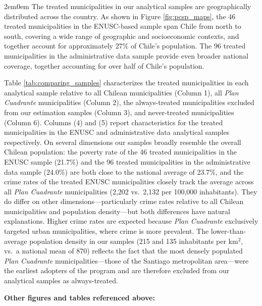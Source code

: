 \begin{adjustwidth}{2em}{0em}
The treated municipalities in our analytical samples are geographically distributed across the country. As shown in Figure \ref{fig:pcsp_maps}, the 46 treated municipalities in the ENUSC-based sample span Chile from north to south, covering a wide range of geographic and socioeconomic contexts, and together account for approximately 27\% of Chile's population. The 96 treated municipalities in the administrative data sample provide even broader national coverage, together accounting for over half of Chile's population.

Table \ref{tab:comparing_samples} characterizes the treated municipalities in each analytical sample relative to all Chilean municipalities (Column 1), all \emph{Plan Cuadrante} municipalities (Column 2), the always-treated municipalities excluded from our estimation samples (Column 3), and never-treated municipalities (Column 6). Columns (4) and (5) report characteristics for the treated municipalities in the ENUSC and administrative data analytical samples respectively. On several dimensions our samples broadly resemble the overall Chilean population: the poverty rate of the 46 treated municipalities in the ENUSC sample (21.7\%) and the 96 treated municipalities in the administrative data sample (24.0\%) are both close to the national average of 23.7\%, and the crime rates of the treated ENUSC municipalities closely track the average across all \emph{Plan Cuadrante} municipalities (2,202 vs.\ 2,132 per 100,000 inhabitants). They do differ on other dimensions---particularly crime rates relative to all Chilean municipalities and population density---but both differences have natural explanations. Higher crime rates are expected because \emph{Plan Cuadrante} exclusively targeted urban municipalities, where crime is more prevalent. The lower-than-average population density in our samples (215 and 135 inhabitants per km$^2$, vs.\ a national mean of 870) reflects the fact that the most densely populated \emph{Plan Cuadrante} municipalities---those of the Santiago metropolitan area---were the earliest adopters of the program and are therefore excluded from our analytical samples as always-treated.
\end{adjustwidth}





\clearpage
\noindent\textbf{Other figures and tables referenced above:}
\vspace{0.5em}

